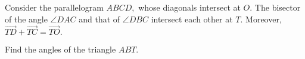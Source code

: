 Consider the parallelogram $ ABCD, $ whose diagonals intersect at $ O. $ The bisector of the angle $ \angle DAC $ and that of $ \angle DBC $ intersect each other at $ T. $ Moreover, $ \overrightarrow{TD} +\overrightarrow{TC} =\overrightarrow{TO} . $

Find the angles of the triangle $ ABT. $